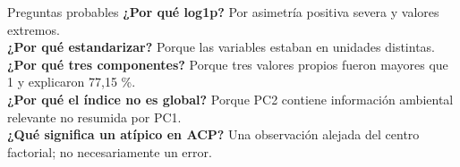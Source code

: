 \documentclass[aspectratio=169,11pt]{beamer}
\begin{document}
\begin{frame}{Preguntas probables}
  \small
  \textbf{¿Por qué log1p?} Por asimetría positiva severa y valores extremos.\\[0.25cm]
  \textbf{¿Por qué estandarizar?} Porque las variables estaban en unidades distintas.\\[0.25cm]
  \textbf{¿Por qué tres componentes?} Porque tres valores propios fueron mayores que 1 y explicaron 77,15 \%.\\[0.25cm]
  \textbf{¿Por qué el índice no es global?} Porque PC2 contiene información ambiental relevante no resumida por PC1.\\[0.25cm]
  \textbf{¿Qué significa un atípico en ACP?} Una observación alejada del centro factorial; no necesariamente un error.
\end{frame}
\end{document}
